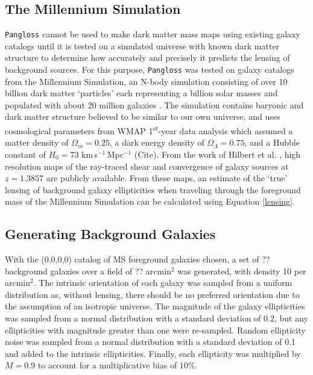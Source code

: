 \documentclass[%
 reprint,
 amsmath,amssymb,
 aps,nofootinbib
]{revtex4-1}
\begin{document}
\subsection{The Millennium Simulation} \label{ms}
\texttt{Pangloss} cannot be used to make dark matter mass maps using existing galaxy catalogs until it is tested on a simulated universe with known dark matter structure to determine how accurately and precisely it predicts the lensing of background sources. For this purpose, \texttt{Pangloss} was tested on galaxy catalogs from the Millennium Simulation, an N-body simulation consisting of over 10 billion dark matter `particles' each representing a billion solar masses and populated with about 20 million galaxies \cite{millennium_simulation}. The simulation contains baryonic and dark matter structure believed to be similar to our own universe, and uses cosmological parameters from WMAP 1\textsuperscript{st}-year data analysis which assumed a matter density of $\Omega_m=0.25$, a dark energy density of $\Omega_\Lambda=0.75$, and a Hubble constant of $H_0=73$ km$\,$s$^{-1}\,$Mpc$^{-1}$ (Cite). From the work of Hilbert et al. \cite{ray_tracing}, high resolution maps of the ray-traced shear and convergence of galaxy sources at $z=1.3857$ are publicly available. From these maps, an estimate of the `true' lensing of background galaxy ellipticities when traveling through the foreground mass of the Millennium Simulation can be calculated using Equation \eqref{lensing}.


\subsection{Generating Background Galaxies}
With the (0,0,0,0) catalog of MS foreground galaxies chosen, a set of ?? background galaxies over a field of ?? arcmin$^2$ was generated, with density 10 per arcmin$^2$. The intrinsic orientation of each galaxy was sampled from a uniform distribution as, without lensing, there should be no preferred orientation due to the assumption of an isotropic universe. The magnitude of the galaxy ellipticities was sampled from a normal distribution with a standard deviation of 0.2, but any ellipticities with magnitude greater than one were re-sampled. Random ellipticity noise was sampled from a normal distribution with a standard deviation of 0.1 and added to the intrinsic ellipticities. Finally, each ellipticity was multiplied by $M=0.9$ to account for a multiplicative bias of 10\%.
\end{document}
